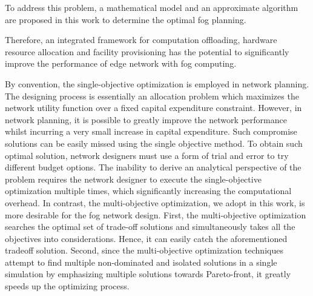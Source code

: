 \documentclass[10pt,journal,compsoc]{IEEEtran}
\begin{document}
To address this problem, a mathematical model and an approximate algorithm are proposed in this work to determine the optimal fog planning. 



Therefore, an integrated framework for computation offloading, hardware resource allocation and facility provisioning has the potential to significantly improve the performance of edge network with fog computing.

By convention, the single-objective optimization is employed in network planning. The designing process is essentially an allocation problem which maximizes the network utility function over a fixed capital expenditure constraint. 
However, in network planning, it is possible to greatly improve the network performance whilst incurring a very small increase in capital expenditure. Such compromise solutions can be easily missed using the single objective method. To obtain such optimal solution, network designers must use a form of trial and error to try different budget options. The inability to derive an analytical perspective of the problem requires the network designer to execute the single-objective optimization multiple times, which significantly increasing the computational overhead. 
In contrast, the multi-objective optimization, we adopt in this work, is more desirable for the fog network design. First, the multi-objective optimization searches the optimal set of trade-off solutions and simultaneously takes all the objectives into considerations. Hence, it can easily catch the aforementioned tradeoff solution.
Second, since the multi-objective optimization techniques attempt to find multiple non-dominated and isolated solutions in a single simulation by emphasizing multiple solutions towards Pareto-front, it greatly speeds up the optimizing process. 
\end{document}
